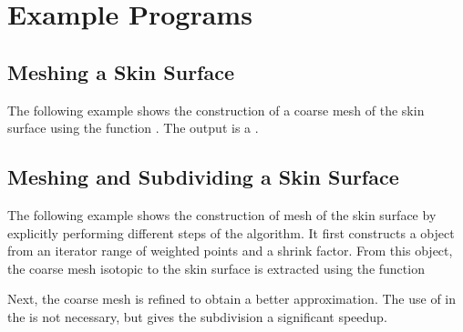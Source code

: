 \section{Example Programs}
\subsection{Meshing a Skin Surface}
The following example shows the construction of a coarse mesh of the
skin surface using the function . The
output is a .

\subsection{Meshing and Subdividing a Skin Surface}
The following example shows the construction of mesh of the skin
surface by explicitly performing different steps of the algorithm. It
first constructs a  object from an iterator range
of weighted points and a shrink factor. From this object, the coarse
mesh isotopic to the skin surface is extracted using the function

Next, the coarse mesh is refined to obtain a better approximation. The
use of  in
the  is not necessary, but gives the subdivision
a significant speedup.



